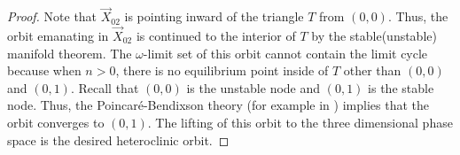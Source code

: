 \documentclass[a4paper,11pt]{article}
\def\red{\color{red}}
\begin{document}
\begin{proof}
\medskip

Note that $\vec{X}_{02}$ is pointing inward of the triangle $T$ from $(0,0)$. Thus, the orbit emanating in $\vec{X}_{02}$ is continued to the interior of $T$ by the stable(unstable) manifold theorem. The $\omega$-limit set of this orbit cannot contain the limit cycle because when $n>0$, there is no equilibrium point inside of $T$ other than $(0,0)$ and $(0,1)$. Recall that $(0,0)$ is the unstable node and $(0,1)$ is the stable node. Thus, the Poincar\'e-Bendixson theory (for example in \cite{perko_differential_2001}) implies that the orbit converges to $(0,1)$.  The lifting of this orbit to the three dimensional phase space is the desired heteroclinic orbit. %
\end{proof}
\end{document}

